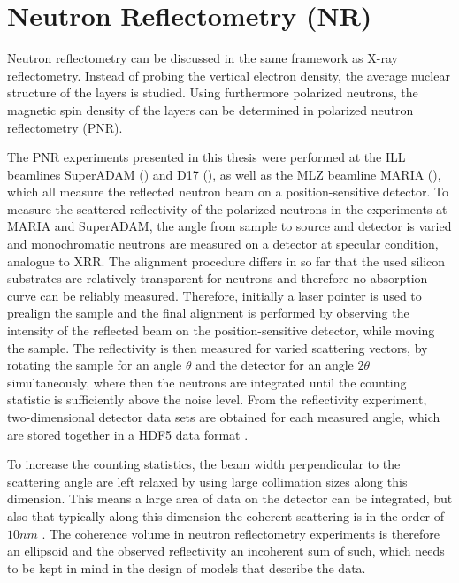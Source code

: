 \documentclass[\main/dresen_thesis.tex]{subfiles}
\begin{document}
  \section{Neutron Reflectometry (NR)}
    \label{ch:methods:nr}
    Neutron reflectometry can be discussed in the same framework as X-ray reflectometry.
    Instead of probing the vertical electron density, the average nuclear structure of the layers is studied.
    Using furthermore polarized neutrons, the magnetic spin density of the layers can be determined in polarized neutron reflectometry (PNR).

    The PNR experiments presented in this thesis were performed at the ILL beamlines SuperADAM () and D17 (), as well as the MLZ beamline MARIA (), which all measure the reflected neutron beam on a position-sensitive detector.
    To measure the scattered reflectivity of the polarized neutrons in the experiments at MARIA and SuperADAM, the angle from sample to source and detector is varied and monochromatic neutrons are measured on a detector at specular condition, analogue to XRR.
    The alignment procedure differs in so far that the used silicon substrates are relatively transparent for neutrons and therefore no absorption curve can be reliably measured.
    Therefore, initially a laser pointer is used to prealign the sample and the final alignment is performed by observing the intensity of the reflected beam on the position-sensitive detector, while moving the sample.
    The reflectivity is then measured for varied scattering vectors, by rotating the sample for an angle $\theta$ and the detector for an angle $2 \theta$ simultaneously, where then the neutrons are integrated until the counting statistic is sufficiently above the noise level.
    From the reflectivity experiment, two-dimensional detector data sets are obtained for each measured angle, which are stored together in a HDF5 data format \cite{HDF5_1997_Hiera}.
    
    To increase the counting statistics, the beam width perpendicular to the scattering angle are left relaxed by using large collimation sizes along this dimension.
    This means a large area of data on the detector can be integrated, but also that typically along this dimension the coherent scattering is in the order of $10 \unit{nm}$ \cite{Mishra_2012_Selfa, Kronmueller_2007_Handb}.
    The coherence volume in neutron reflectometry experiments is therefore an ellipsoid and the observed reflectivity an incoherent sum of such, which needs to be kept in mind in the design of models that describe the data.
\end{document}
